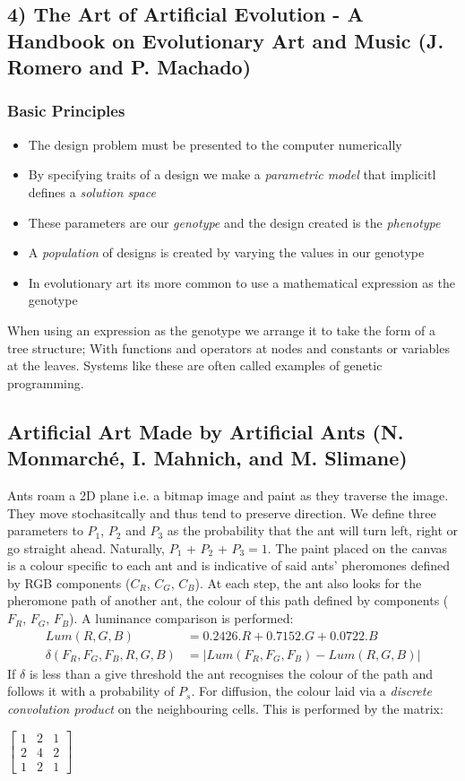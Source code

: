 \documentclass{article}
\begin{document}
\subsection*{4) The Art of Artificial Evolution -
A Handbook on Evolutionary Art and Music (J. Romero and P. Machado)}
\subsubsection*{Basic Principles}
\begin{itemize}
    \item The design problem must be presented to the computer numerically
    \item By specifying traits of a design we make a \emph{parametric model} that implicitl defines a \emph{solution space}
    \item These parameters are our \emph{genotype} and the design created is the \emph{phenotype}
    \item A \emph{population} of designs is created by varying the values in our genotype
    \item In evolutionary art its more common to use a mathematical expression as the genotype
\end{itemize}
When using an expression as the genotype we arrange it to take the form of a tree structure; With functions and operators at nodes and constants or variables at the leaves.
Systems like these are often called examples of genetic programming. 

\subsection*{Artificial Art Made by Artificial Ants (N. Monmarché, I. Mahnich, and M. Slimane)}
Ants roam a 2D plane i.e. a bitmap image and paint as they traverse the image.
They move stochasitcally and thus tend to preserve direction.
We define three parameters to $P_1$, $P_2$ and $P_3$ as the probability that the ant will turn left, right or go straight ahead.
Naturally, $P_1$ + $P_2$ + $P_3=1$.  The paint placed on the canvas is a colour specific to each ant and is indicative of said ants' pheromones defined by RGB components ($C_R$, $C_G$, $C_B$).
At each step, the ant also looks for the pheromone path of another ant, the colour of this path defined by components ($F_R$, $F_G$, $F_B$).
A luminance comparison is performed:
\begin{align*}
   Lum(R,G,B) &= 0.2426 . R + 0.7152 . G + 0.0722 . B\\
   \delta(F_R, F_G, F_B, R,G,B) &= |Lum(F_R, F_G, F_B) - Lum(R,G,B)|
\end{align*}
If $\delta$ is less than a give threshold the ant recognises the colour of the path and follows it with a probability of $P_s$.
For diffusion, the colour laid via a \emph{discrete convolution product} on the neighbouring cells.
This is performed by the matrix:
\begin{center}
$
\begin{bmatrix}
    1 & 2 & 1\\
    2 & 4 & 2\\
    1 & 2 & 1
\end{bmatrix}
$
\end{center}
\end{document}
